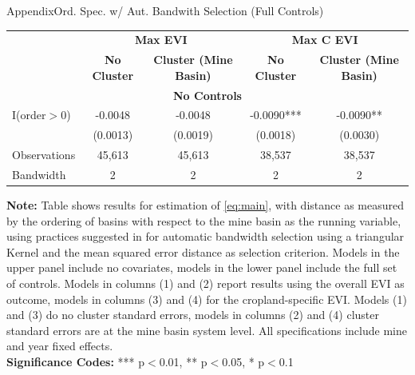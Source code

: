 \documentclass[aspectratio=169,11pt,dvipsnames, handout]{beamer}
\begin{document}

\begin{frame}{\textcolor{defaultclr!30}{Appendix}\hspace{0.75em}Ord. Spec. w/ Aut. Bandwith Selection (Full Controls)}


\centering
\begin{adjustbox}{width=\textwidth}
\begin{tabular}{lcccc}
\toprule
& \multicolumn{2}{c}{\textbf{Max EVI}} & \multicolumn{2}{c}{\textbf{Max C EVI}} \\
\cmidrule(lr){2-3} \cmidrule(lr){4-5}
& \textbf{No Cluster} & \textbf{Cluster (Mine Basin)} & \textbf{No Cluster} & \textbf{Cluster (Mine Basin)} \\
\midrule
\multicolumn{5}{c}{\textbf{No Controls}} \\
\midrule
I(order$>$0) & -0.0048 & -0.0048 & -0.0090*** & -0.0090** \\
& (0.0013) & (0.0019) & (0.0018) & (0.0030) \\
\midrule
Observations & 45,613 & 45,613 & 38,537 & 38,537 \\
Bandwidth & 2 & 2 & 2 & 2 \\
\bottomrule
\end{tabular}
\end{adjustbox}

\vspace{0.5em}

\scriptsize{
\textbf{Note:} Table shows results for estimation of \autoref{eq:main}, with distance as measured by the ordering of basins with respect to the mine basin as the running variable, using practices suggested in \cite{kolesar2018} for automatic bandwidth selection using a triangular Kernel and the mean squared error distance as selection criterion. Models in the upper panel include no covariates, models in the lower panel include the full set of controls. Models in columns (1) and (2) report results using the overall EVI as outcome, models in columns (3) and (4) for the cropland-specific EVI. Models (1) and (3) do no cluster standard errors, models in columns (2) and (4) cluster standard errors are at the mine basin system level. All specifications include mine and year fixed effects. \\
\textbf{Significance Codes:} *** p$<$0.01, ** p$<$0.05, * p$<$0.1 
}

\end{frame}

\end{document}
